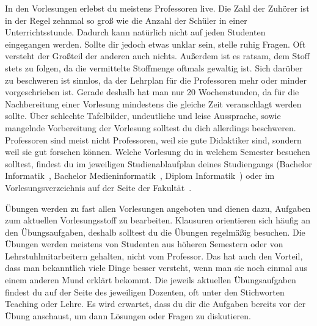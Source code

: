 
In den Vorlesungen erlebst du meistens Professoren live.
Die Zahl der Zuhörer ist in der Regel zehnmal so groß wie die Anzahl der Schüler in einer Unterrichtsstunde. Dadurch kann natürlich nicht auf jeden Studenten eingegangen werden.
Sollte dir jedoch etwas unklar sein, stelle ruhig Fragen. Oft versteht der Großteil der anderen auch nichts.
Außerdem ist es ratsam, dem Stoff stets zu folgen, da die vermittelte Stoffmenge oftmals gewaltig ist. Sich darüber zu beschweren ist sinnlos, da der Lehrplan für die Professoren mehr oder minder vorgeschrieben ist.
Gerade deshalb hat man nur 20 Wochenstunden, da für die Nachbereitung einer Vorlesung mindestens die gleiche Zeit veranschlagt werden sollte.
Über schlechte Tafelbilder, undeutliche und leise Aussprache, sowie mangelnde Vorbereitung der Vorlesung solltest du dich allerdings beschweren.
Professoren sind meist nicht Professoren, weil sie gute Didaktiker sind, sondern weil sie gut forschen können.
Welche Vorlesung du in welchem Semester besuchen solltest, findest du im jeweiligen Studienablaufplan deines Studiengangs
(Bachelor Informatik~, Bachelor Medieninformatik~, Diplom Informatik~) oder im Vorlesungsverzeichnis auf der Seite der Fakultät~.



Übungen werden zu fast allen Vorlesungen angeboten und dienen dazu, Aufgaben zum aktuellen Vorlesungsstoff zu bearbeiten. Klausuren orientieren sich häufig an den Übungsaufgaben, deshalb solltest du die Übungen
regelmäßig besuchen. Die Übungen werden meistens von Studenten aus höheren Semestern oder von Lehrstuhlmitarbeitern gehalten, nicht vom Professor.
Das hat auch den Vorteil, dass man bekanntlich viele Dinge besser versteht, wenn man sie noch einmal aus einem anderen Mund erklärt bekommt.
Die jeweils aktuellen Übungsaufgaben findest du auf der Seite des jeweiligen Dozenten, oft unter den Stichworten Teaching oder Lehre.
Es wird erwartet, dass du dir die Aufgaben bereits vor der Übung anschaust, um dann Lösungen oder Fragen zu diskutieren.




